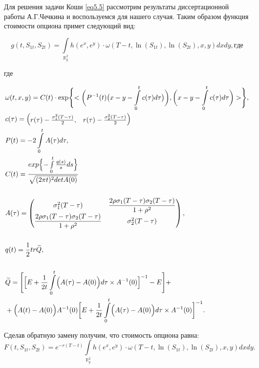 \documentclass[a4paper, 12pt]{extreport}
\numberwithin{equation}{section}
\begin{document}
	
	Для решения задачи Коши \eqref{eq5.5} рассмотрим результаты диссертационной работы А.Г.Чечкина \cite{1} и воспользуемся для нашего случая. Таким образом функция стоимости опциона примет следующий вид:  

	\begin{equation*}
	g(t,S_{1t},S_{2t})=\int \limits_{\mathbb{R}_y^2} h(e^x,e^y) \cdot \omega(T-t,\ln(S_{1t}),\ln(S_{2t}),x,y)dxdy , где
	\end{equation*}
	
	где
	
	\begin{align*}
	&\omega(t,x,y)= C(t)  \cdot \exp\Biggl\{< \biggl(P^{-1}(t) \bigl(x-y-\int\limits_0^tc(\tau)d\tau\bigr)\biggr),\biggl(x-y-\int\limits_0^tc(\tau)d\tau\biggr)>\Biggr\},\\ 
	&c(\tau)=
	\begin{pmatrix}
	r(\tau)-\frac{\sigma_{1}^2(T-\tau)}{2}, & 	r(\tau)-\frac{\sigma_{2}^2(T-\tau)}{2}
	\end{pmatrix} \\ 
	&P(t)=-2\int\limits_0^t A(\tau)d\tau,\\ 
	&C(t)=\dfrac{exp\Bigl\{ -\int\limits_0^t\frac{q(s)}{s}ds\Bigr\}}{\sqrt{(2\pi t)^2 detA(0)}}\\ \\
	&A(\tau)=
	\begin{pmatrix}
	\sigma_{1}^2(T-\tau) & \dfrac{2\rho\sigma_{1}(T-\tau)\sigma_{2}(T-\tau)}{1+\rho^2} \\
	\dfrac{2\rho\sigma_{1}(T-\tau)\sigma_{2}(T-\tau)}{1+\rho^2} & \sigma_{2}^2(T-\tau)
	\end{pmatrix}, \\ \\
	& q(t)=\frac{1}{2} tr\widetilde{Q},\\ \\
	&\widetilde{Q}=\Biggl[\Bigl[E+\frac{1}{2t}\int\limits_0^t\Bigl(A(\tau)-A(0)\Bigr)d\tau\times A^{-1}(0)\Bigr]^{-1}-E\Biggr] +\\ 
	&+\Bigl(A(t)-A(0)\Bigr)A^{-1}(0)\biggl[E+\frac{1}{2t}\int\limits_0^t\Bigl(A(\tau)-A(0)\Bigr)d\tau\times A^{-1}(0)\biggr]^{-1} .
	\end{align*}
	

	
		

	Сделав обратную замену получим, что стоимость опциона равна:
	\begin{equation}\label{6.1}
		F(t,S_{1t},S_{2t})=e^{-r(T-t)}\int \limits_{\mathbb{R}_y^2} h(e^x,e^y) \cdot \omega(T-t,\ln(S_{1t}),\ln(S_{2t}),x,y)dxdy.
	\end{equation}
		
\end{document}
